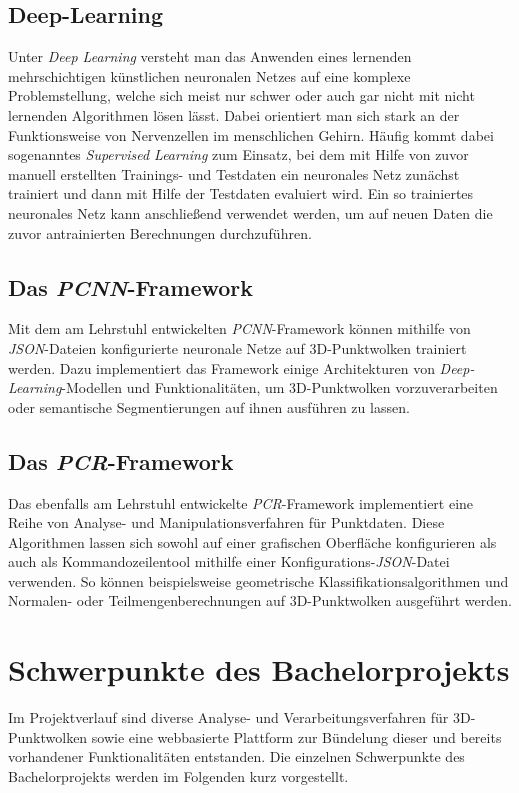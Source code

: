 \subsection*{Deep-Learning}
Unter \textit{Deep Learning} versteht man das Anwenden eines lernenden mehrschichtigen künstlichen neuronalen Netzes auf eine komplexe Problemstellung, welche sich meist nur schwer oder auch gar nicht mit nicht lernenden Algorithmen lösen lässt. Dabei orientiert man sich stark an der Funktionsweise von Nervenzellen im menschlichen Gehirn. Häufig kommt dabei sogenanntes \textit{Supervised Learning} zum Einsatz, bei dem mit Hilfe von zuvor manuell erstellten Trainings- und Testdaten ein neuronales Netz zunächst trainiert und dann mit Hilfe der Testdaten evaluiert wird. Ein so trainiertes neuronales Netz kann anschließend verwendet werden, um auf neuen Daten die zuvor antrainierten Berechnungen durchzuführen.

\subsection*{Das \textit{PCNN}-Framework}

Mit dem am Lehrstuhl entwickelten \textit{PCNN}-Framework können mithilfe von \textit{JSON}-Dateien konfigurierte neuronale Netze auf 3D-Punktwolken trainiert werden. Dazu implementiert das Framework einige Architekturen von \textit{Deep-Learning}-Modellen und Funktionalitäten, um 3D-Punktwolken vorzuverarbeiten oder semantische Segmentierungen auf ihnen ausführen zu lassen.

\subsection*{Das \textit{PCR}-Framework}

Das ebenfalls am Lehrstuhl entwickelte \textit{PCR}-Framework implementiert eine Reihe von Analyse- und Manipulationsverfahren für Punktdaten. Diese Algorithmen lassen sich sowohl auf einer grafischen Oberfläche konfigurieren als auch als Kommandozeilentool mithilfe einer Konfigurations-\textit{JSON}-Datei verwenden. So können beispielsweise geometrische Klassifikationsalgorithmen und Normalen- oder Teilmengenberechnungen auf 3D-Punktwolken ausgeführt werden.

\section{Schwerpunkte des Bachelorprojekts}

Im Projektverlauf sind diverse Analyse- und Verarbeitungsverfahren für 3D-Punktwolken sowie eine webbasierte Plattform zur Bündelung dieser und bereits vorhandener Funktionalitäten entstanden.
Die einzelnen Schwerpunkte des Bachelorprojekts werden im Folgenden kurz vorgestellt.

